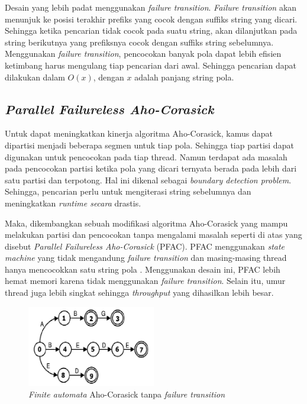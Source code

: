     Desain yang lebih padat menggunakan \emph{failure transition}. \emph{Failure transition} akan menunjuk ke posisi terakhir prefiks yang cocok dengan suffiks string yang dicari. Sehingga ketika pencarian tidak cocok pada suatu string, akan dilanjutkan pada string berikutnya yang prefiksnya cocok dengan suffiks string sebelumnya. Menggunakan \emph{failure transition}, pencocokan banyak pola dapat lebih efisien ketimbang harus mengulang tiap pencarian dari awal. Sehingga pencarian dapat dilakukan dalam $O(x)$, dengan $x$ adalah panjang string pola.

  \subsection {\emph{Parallel Failureless Aho-Corasick}}

    Untuk dapat meningkatkan kinerja algoritma Aho-Corasick, kamus dapat dipartisi menjadi beberapa segmen untuk tiap pola. Sehingga tiap partisi dapat digunakan untuk pencocokan pada tiap thread. Namun terdapat ada masalah pada pencocokan partisi ketika pola yang dicari ternyata berada pada lebih dari satu partisi dan terpotong. Hal ini dikenal sebagai \emph{boundary detection problem}. Sehingga, pencarian perlu untuk mengiterasi string sebelumnya dan meningkatkan \emph{runtime secara} drastis.

    Maka, dikembangkan sebuah modifikasi algoritma Aho-Corasick yang mampu melakukan partisi dan pencocokan tanpa mengalami masalah seperti di atas yang disebut \emph{Parallel Failureless Aho-Corasick} (PFAC). PFAC menggunakan \emph{state machine} yang tidak mengandung \emph{failure transition} dan masing-masing thread hanya mencocokkan satu string pola \parencite{lin2013}. Menggunakan desain ini, PFAC lebih hemat memori karena tidak menggunakan \emph{failure transition}. Selain itu, umur thread juga lebih singkat sehingga \emph{throughput} yang dihasilkan lebih besar.

    \begin{figure}[H]
      \centering
      \includegraphics[width=0.5\textwidth]{resources/pfac.png}
      \caption{\emph{Finite automata} Aho-Corasick tanpa \emph{failure transition} \parencite{lin2013}}
    \end{figure}

